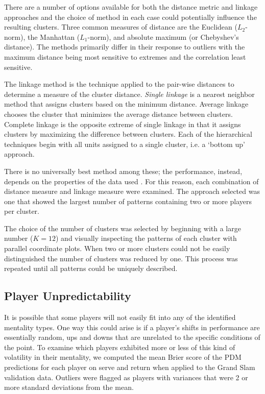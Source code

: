\documentclass{Latex/svjour3}
\begin{document}
There are a number of options available for both the distance metric and linkage
approaches and the choice of method in each case could potentially influence the
resulting clusters. Three common measures of distance are the Euclidean
($L_2$-norm), the Manhattan ($L_1$-norm), and absolute maximum (or Chebyshev's
distance). The methods primarily differ in their response to outliers with the
maximum distance being most sensitive to extremes and the correlation least
sensitive.

The linkage method is the technique applied to the pair-wise distances to
determine a measure of the cluster distance. \textit{Single linkage} is a
nearest neighbor method that assigns clusters based on the minimum
distance. Average linkage chooses the cluster that minimizes the average
distance between clusters. Complete linkage is the opposite extreme of single
linkage in that it assigns clusters by maximizing the difference between
clusters. Each of the hierarchical techniques begin with all units assigned to a
single cluster, i.e. a `bottom up' approach.

There is no universally best method among these; the performance, instead,
depends on the properties of the data used \cite{kumar2014performance}. For this
reason, each combination of distance measure and linkage measure were
examined. The approach selected was one that showed the largest number of
patterns containing two or more players per cluster.

The choice of the number of clusters was selected by beginning with a large
number ($K = 12$) and visually inspecting the patterns of each cluster with
parallel coordinate plots. When two or more clusters could not be easily
distinguished the number of clusters was reduced by one. This process was
repeated until all patterns could be uniquely described.


\subsection{Player Unpredictability}

It is possible that some players will not easily fit into any of the identified
mentality types. One way this could arise is if a player's shifts in performance
are essentially random, ups and downs that are unrelated to the specific
conditions of the point. To examine which players exhibited more or less of this
kind of volatility in their mentality, we computed the mean Brier score of the
PDM predictions for each player on serve and return when applied to the Grand
Slam validation data. Outliers were flagged as players with variances that were
2 or more standard deviations from the mean.
\end{document}
